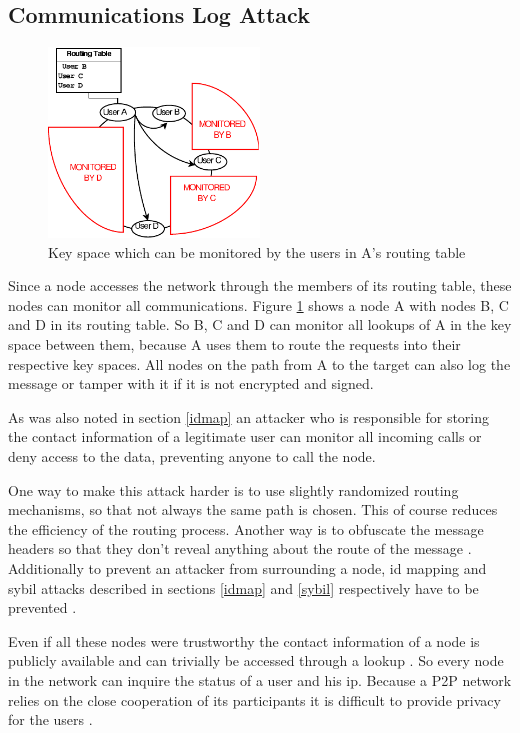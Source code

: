 \documentclass[a4paper,10pt]{article}
\begin{document}
\subsection{Communications Log Attack}
\label{comlog}
\begin{figure}
\centering
\includegraphics[width=0.5\textwidth]{log}

\caption{Key space which can be monitored by the users in A's routing table
\cite{touceda}}
\label{fig:log}
\end{figure}
Since a node accesses the network through the members of its routing table,
these nodes can monitor all communications. Figure \ref{fig:log} shows a node A
with
nodes B, C and D in its routing table. So
B, C and D can monitor all lookups of A in the key space between them, because A
uses them to route the requests into their respective key spaces. All
nodes on the path from A to the target can also log the message or tamper with
it if it is not encrypted and signed.

As was also noted in section \ref{idmap} an attacker who is responsible for
storing the contact information of a legitimate user can monitor all
incoming calls or deny access to the data, preventing anyone to call the node.

One way to make this attack harder is to use slightly randomized routing
mechanisms, so that not always the same path is chosen. This of course
reduces the efficiency of the routing process. Another way is to obfuscate the
message headers so that they don't reveal anything about the route of
the message \cite{touceda}.
Additionally to prevent an attacker from surrounding a node, id mapping and
sybil attacks described in sections \ref{idmap} and \ref{sybil} respectively
have
to be prevented \cite{touceda}.

Even if all these nodes were trustworthy the contact information of a node is
publicly available and can trivially be accessed through a lookup
\cite{koskelaold}.
So every node in the network can inquire the status of a user and his ip.
Because a P2P network relies on the close cooperation of its participants
it is difficult to provide privacy for the users \cite{koskelaold}.
\end{document}
